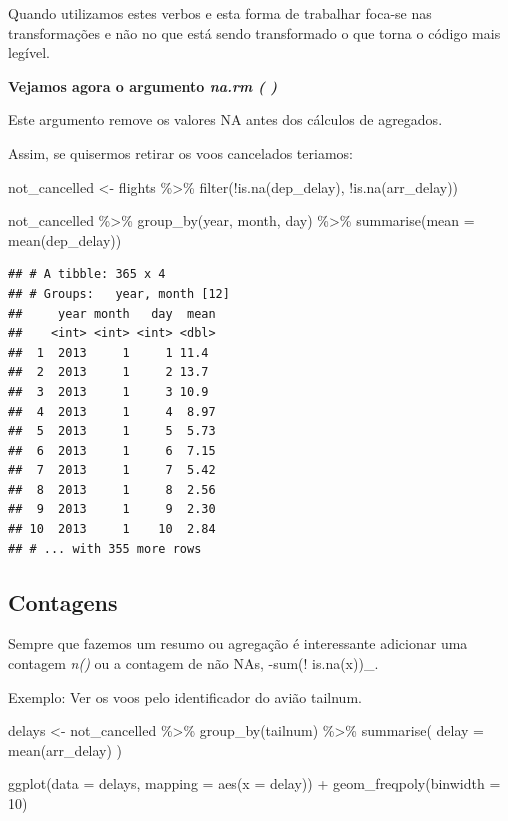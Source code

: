 \documentclass[
]{article}
\newenvironment{Shaded}{\begin{snugshade}}{\end{snugshade}}
\newcommand{\AttributeTok}[1]{\textcolor[rgb]{0.77,0.63,0.00}{#1}}
\newcommand{\DecValTok}[1]{\textcolor[rgb]{0.00,0.00,0.81}{#1}}
\newcommand{\FunctionTok}[1]{\textcolor[rgb]{0.00,0.00,0.00}{#1}}
\newcommand{\NormalTok}[1]{#1}
\newcommand{\OtherTok}[1]{\textcolor[rgb]{0.56,0.35,0.01}{#1}}
\newcommand{\SpecialCharTok}[1]{\textcolor[rgb]{0.00,0.00,0.00}{#1}}
\begin{document}
Quando utilizamos estes verbos e esta forma de trabalhar foca-se nas
transformações e não no que está sendo transformado o que torna o código
mais legível.

\textbf{Vejamos agora o argumento \emph{na.rm ( )}}

Este argumento remove os valores NA antes dos cálculos de agregados.

Assim, se quisermos retirar os voos cancelados teriamos:

\begin{Shaded}
\begin{Highlighting}[]
\NormalTok{not\_cancelled }\OtherTok{\textless{}{-}}\NormalTok{ flights }\SpecialCharTok{\%\textgreater{}\%} 
  \FunctionTok{filter}\NormalTok{(}\SpecialCharTok{!}\FunctionTok{is.na}\NormalTok{(dep\_delay), }\SpecialCharTok{!}\FunctionTok{is.na}\NormalTok{(arr\_delay))}

\NormalTok{not\_cancelled }\SpecialCharTok{\%\textgreater{}\%} 
  \FunctionTok{group\_by}\NormalTok{(year, month, day) }\SpecialCharTok{\%\textgreater{}\%} 
  \FunctionTok{summarise}\NormalTok{(}\AttributeTok{mean =} \FunctionTok{mean}\NormalTok{(dep\_delay))}
\end{Highlighting}
\end{Shaded}

\begin{verbatim}
## # A tibble: 365 x 4
## # Groups:   year, month [12]
##     year month   day  mean
##    <int> <int> <int> <dbl>
##  1  2013     1     1 11.4 
##  2  2013     1     2 13.7 
##  3  2013     1     3 10.9 
##  4  2013     1     4  8.97
##  5  2013     1     5  5.73
##  6  2013     1     6  7.15
##  7  2013     1     7  5.42
##  8  2013     1     8  2.56
##  9  2013     1     9  2.30
## 10  2013     1    10  2.84
## # ... with 355 more rows
\end{verbatim}

\hypertarget{contagens}{%
\subsection{Contagens}\label{contagens}}

Sempre que fazemos um resumo ou agregação é interessante adicionar uma
contagem \emph{n()} ou a contagem de não NAs, -sum(! is.na(x))\_.

Exemplo: Ver os voos pelo identificador do avião tailnum.

\begin{Shaded}
\begin{Highlighting}[]
\NormalTok{delays }\OtherTok{\textless{}{-}}\NormalTok{ not\_cancelled }\SpecialCharTok{\%\textgreater{}\%} 
  \FunctionTok{group\_by}\NormalTok{(tailnum) }\SpecialCharTok{\%\textgreater{}\%} 
  \FunctionTok{summarise}\NormalTok{(}
    \AttributeTok{delay =} \FunctionTok{mean}\NormalTok{(arr\_delay)}
\NormalTok{  )}

\FunctionTok{ggplot}\NormalTok{(}\AttributeTok{data =}\NormalTok{ delays, }\AttributeTok{mapping =} \FunctionTok{aes}\NormalTok{(}\AttributeTok{x =}\NormalTok{ delay)) }\SpecialCharTok{+} 
  \FunctionTok{geom\_freqpoly}\NormalTok{(}\AttributeTok{binwidth =} \DecValTok{10}\NormalTok{)}
\end{Highlighting}
\end{Shaded}
\end{document}

